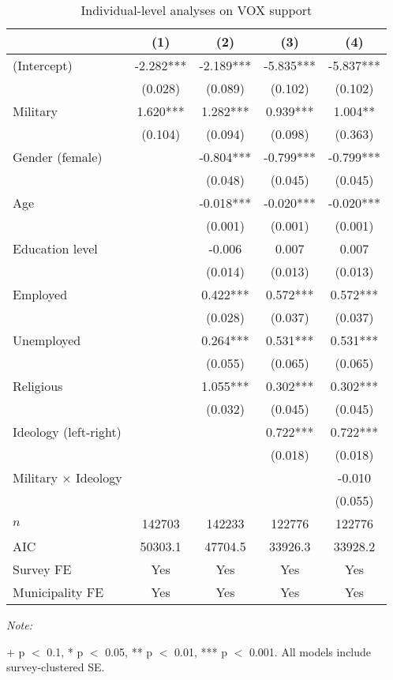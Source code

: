 \begin{table}[!h]

\caption{Individual-level analyses on VOX support\label{tab:survey_glm}}
\centering
\begin{threeparttable}
\begin{tabular}[t]{lcccc}
\toprule
  & (1) & (2) & (3) & (4)\\
\midrule
(Intercept) & -2.282*** & -2.189*** & -5.835*** & -5.837***\\
 & (0.028) & (0.089) & (0.102) & (0.102)\\
Military & 1.620*** & 1.282*** & 0.939*** & 1.004**\\
 & (0.104) & (0.094) & (0.098) & (0.363)\\
Gender (female) &  & -0.804*** & -0.799*** & -0.799***\\
 &  & (0.048) & (0.045) & (0.045)\\
Age &  & -0.018*** & -0.020*** & -0.020***\\
 &  & (0.001) & (0.001) & (0.001)\\
Education level &  & -0.006 & 0.007 & 0.007\\
 &  & (0.014) & (0.013) & (0.013)\\
Employed &  & 0.422*** & 0.572*** & 0.572***\\
 &  & (0.028) & (0.037) & (0.037)\\
Unemployed &  & 0.264*** & 0.531*** & 0.531***\\
 &  & (0.055) & (0.065) & (0.065)\\
Religious &  & 1.055*** & 0.302*** & 0.302***\\
 &  & (0.032) & (0.045) & (0.045)\\
Ideology (left-right) &  &  & 0.722*** & 0.722***\\
 &  &  & (0.018) & (0.018)\\
Military $\times$ Ideology &  &  &  & -0.010\\
 &  &  &  & (0.055)\\
\midrule
$n$ & 142703 & 142233 & 122776 & 122776\\
AIC & 50303.1 & 47704.5 & 33926.3 & 33928.2\\
Survey FE & Yes & Yes & Yes & Yes\\
Municipality FE & Yes & Yes & Yes & Yes\\
\bottomrule
\end{tabular}
\begin{tablenotes}[para]
\item \textit{Note: } 
\item + p $<$ 0.1, * p $<$ 0.05, ** p $<$ 0.01, *** p $<$ 0.001. All models include survey-clustered SE.
\end{tablenotes}
\end{threeparttable}
\end{table}
